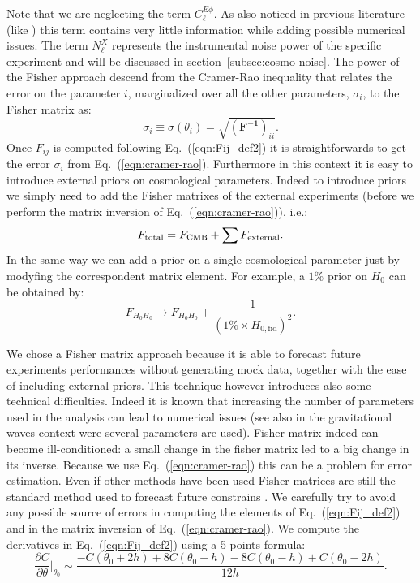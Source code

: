 \documentclass[aps,prd,reprint,superscriptaddress]{revtex4-1}
\newcommand\refeq[1]{Eq.~(\ref{eqn:#1})}
\newcommand{\refssec}[1]{section~\ref{subsec:#1}}
\begin{document}
Note that we are neglecting the term $C_\ell^{E\phi}$. As also noticed in previous literature (like \cite{wu:2014,2013PhRvD..87h3008H}) this term contains very little information while adding possible numerical issues.
The term $N_\ell^{X}$ represents the instrumental noise power of the specific experiment and will be discussed in \refssec{cosmo-noise}.
The power of the Fisher approach descend from the Cramer-Rao inequality that relates the error on the parameter $i$, marginalized over all the other parameters, $\sigma_i$, to the Fisher matrix as:
\begin{equation}
\sigma_i \equiv \sigma (\theta_i) = \sqrt{(\mathbf{ F^{-1}})_{ii}}.
\label{eqn:cramer-rao}
\end{equation}
Once $F_{ij}$ is computed following \refeq{Fij_def2} it is straightforwards to get the error $\sigma_i$ from \refeq{cramer-rao}. Furthermore in this context it is easy to introduce external priors on cosmological parameters.
Indeed to introduce priors we simply need to add the Fisher matrixes of the external experiments (before we perform the matrix inversion of \refeq{cramer-rao}), i.e.:
\begin{equation}
F_{\rm total}=F_{\rm CMB}+\sum F_{\rm external}.
\end{equation}
In the same way we can add a prior on a single cosmological parameter just by modyfing the correspondent matrix element.
For example, a $1\%$ prior on $H_{0}$ can be obtained by:
\begin{equation}
F_{H_0 H_0} \rightarrow F_{H_0 H_0} + \frac{1}{(1\% \times H_{0,\text{fid}})^2}.
\end{equation}


We chose a Fisher matrix approach because it is able to forecast future experiments performances without generating mock data, together with the ease of including external priors. 
This technique however introduces also some technical difficulties. 
Indeed it is known \cite{2006astro.ph..9591A} that increasing the number of parameters used in the analysis can lead to numerical issues (see also \cite{2008PhRvD..77d2001V} in the gravitational waves context were several parameters are used).
Fisher matrix indeed can become ill-conditioned: a small change in the fisher matrix led to a big change in its inverse. Because we use \refeq{cramer-rao} this can be a problem for error estimation. 
Even if other methods have been used \cite{2006JCAP...10..013P,2006astro.ph..9591A} Fisher matrices are still the standard method used to forecast future constrains \cite{wu:2014}.
We carefully try to avoid any possible source of errors in computing the elements of \refeq{Fij_def2} and in the matrix inversion of \refeq{cramer-rao}.
We compute the derivatives in \refeq{Fij_def2} using a 5 points formula:
\begin{equation}
\frac{\partial C}{\partial \theta}\bigg|_{\theta_{0}} \sim \frac{-C(\theta_{0}+2h)+8C(\theta_{0}+h)-8C(\theta_{0}-h)+C(\theta_{0}-2h)}{12h}.
\label{eqn:deriv}
\end{equation}
\end{document}
